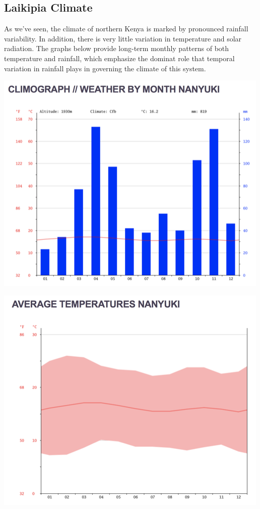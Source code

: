 \documentclass[11pt]{article}
\makeatletter
\def\maxwidth{\ifdim\Gin@nat@width>\linewidth\linewidth
    \else\Gin@nat@width\fi}
\let\Oldincludegraphics\includegraphics
\renewcommand{\includegraphics}[1]{\Oldincludegraphics[width=.8\maxwidth]{#1}}
\makeatother
\begin{document}
\hypertarget{laikipia-climate}{%
\subsection{Laikipia Climate}\label{laikipia-climate}}

As we've seen, the climate of northern Kenya is marked by pronounced
rainfall variability. In addition, there is very little variation in
temperature and solar radiation. The graphs below provide long-term
monthly patterns of both temperature and rainfall, which emphasize the
dominat role that temporal variation in rainfall plays in governing the
climate of this system.

\includegraphics{../assets/nanyuki_rainfall.png}

\includegraphics{../assets/nanyuki_temperature.png}
\end{document}
